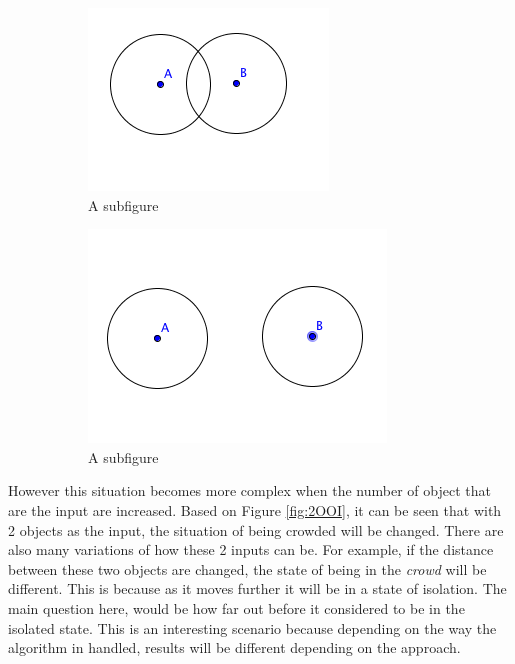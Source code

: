 \documentclass[a4paper,11pt]{article}
\begin{document}
\begin{figure}[h]
\centering
\begin{subfigure}{.4\textwidth}
  \centering
  \includegraphics[width=.4\linewidth]{2OOIClose}
  \caption{A subfigure}
  \label{fig:1OOI}
\end{subfigure}%
\begin{subfigure}{.4\textwidth}
  \centering
  \includegraphics[width=.4\linewidth]{2OOIFar}
  \caption{A subfigure}
  \label{fig:2OOIFar}
\end{subfigure}
\caption{}
\label{fig:Condition}
\end{figure}

However this situation becomes more complex when the number of object that are the input are increased. Based on Figure \ref{fig:2OOI}, it can be seen that with 2 objects as the input, the situation of being crowded will be changed. There are also many variations of how these 2 inputs can be. For example, if the distance between these two objects are changed, the state of being in the \textit{crowd} will be different. This is because as it moves further it will be in a state of isolation. The main question here, would be how far out before it considered to be in the isolated state. This is an interesting scenario because depending on the way the algorithm in handled, results will be different depending on the approach.
\end{document}
